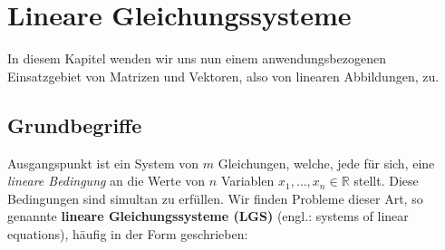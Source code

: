 \chapter[Lineare Gleichungssysteme]{Lineare Gleichungssysteme}
\hfill\hbox{}

\vspace{10mm}
\noindent
In diesem Kapitel wenden wir uns nun einem anwendungsbezogenen
Einsatzgebiet von Matrizen und Vektoren, also von linearen
Abbildungen, zu.

\section[Grundbegriffe]%
{Grundbegriffe}
Ausgangspunkt ist ein System von $m$ Gleichungen, welche, jede
f\"ur sich, eine {\em lineare Bedingung\/} an die Werte von $n$
Variablen $x_{1}, %
\ldots, x_{n} \in \mathbb{R}$ stellt. Diese Bedingungen
sind simultan zu erf\"ullen. Wir finden Probleme dieser Art,
so genannte {\bf lineare Gleichungssysteme (LGS)} (engl.: 
systems of linear equations), h\"aufig in der Form geschrieben:

